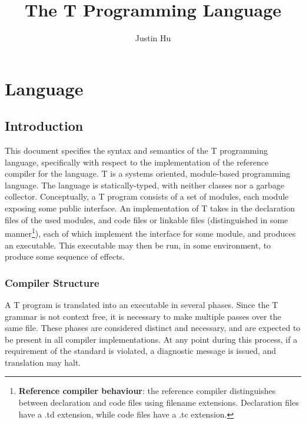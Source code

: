 \documentclass[letterpaper,12pt]{book}
\begin{document}
\title{The T Programming Language}
\author{Justin Hu}
\maketitle
\tableofcontents

\part{Language}

\chapter{Introduction}

This document specifies the syntax and semantics of the T programming language, specifically with respect to the implementation of the reference compiler for the language. T is a systems oriented, module-based programming language. The language is statically-typed, with neither classes nor a garbage collector. Conceptually, a T program consists of a set of modules, each module exposing some public interface. An implementation of T takes in the declaration files of the used modules, and code files or linkable files (distinguished in some manner\footnote{\textbf{Reference compiler behaviour}: the reference compiler distinguishes between declaration and code files using filename extensions. Declaration files have a .td extension, while code files have a .tc extension.}), each of which implement the interface for some module, and produces an executable. This executable may then be run, in some environment, to produce some sequence of effects.

\section{Compiler Structure}

A T program is translated into an executable in several phases. Since the T grammar is not context free, it is necessary to make multiple passes over the same file. These phases are considered distinct and necessary, and are expected to be present in all compiler implementations. At any point during this process, if a requirement of the standard is violated, a diagnostic message is issued, and translation may halt.
\end{document}
